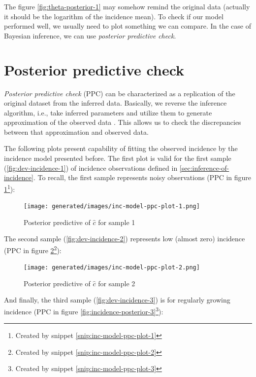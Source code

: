 \documentclass[
  digital, %
  oneside, %
  lof,     %
  lot,     %
]{fithesis4}
\begin{document}
The figure \ref{fig:theta-posterior-1} may somehow remind
the original data (actually it should be the logarithm of the incidence mean).
To check if our model performed well, we usually 
need to plot something we can compare. In the case of
Bayesian inference, we can use \textit{posterior predictive check}.


\section{Posterior predictive check}

\textit{Posterior predictive check} (PPC) can be characterized as a replication
of the original dataset from the inferred data. 
Basically, we reverse the inference algorithm,
i.e., take inferred parameters and utilize them to generate
approximation of the observed data \cite{davidson-pilon2015}.
This allows us to check the discrepancies between that approximation
and observed data.

The following plots present capability of fitting the observed
incidence by the incidence model presented before. The first plot
is valid for the first sample (\ref{fig:dev-incidence-1}) of incidence observations defined in \autoref{sec:inference-of-incidence}.
To recall, the first sample represents noisy 
observations (PPC in figure \ref{fig:incidence-posterior-1}\footnote{Created by snippet \ref{snip:inc-model-ppc-plot-1}}):

\begin{figure}[H]
  \centering
  \texttt{[image: generated/images/inc-model-ppc-plot-1.png]}
  \caption{Posterior predictive of $\hat{c}$ for sample 1}
  \label{fig:incidence-posterior-1}
\end{figure}

The second sample (\ref{fig:dev-incidence-2}) represents low (almost zero) 
incidence (PPC in figure \ref{fig:incidence-posterior-2}\footnote{Created by snippet \ref{snip:inc-model-ppc-plot-2}}):

\begin{figure}[H]
  \centering
  \texttt{[image: generated/images/inc-model-ppc-plot-2.png]}
  \caption{Posterior predictive of $\hat{c}$ for sample 2}
  \label{fig:incidence-posterior-2}
\end{figure}

And finally, the third sample (\ref{fig:dev-incidence-3}) is for
regularly growing
incidence (PPC in figure \ref{fig:incidence-posterior-3}\footnote{Created by snippet \ref{snip:inc-model-ppc-plot-3}}):
\end{document}
